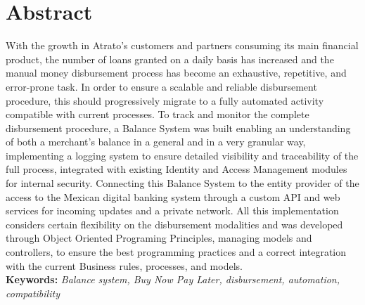 
\chapter*{Abstract}

With the growth in Atrato’s customers and partners consuming its main financial product, the number of loans granted on a daily basis has increased and the manual money disbursement process has become an exhaustive, repetitive, and error-prone task. 
In order to ensure a scalable and reliable disbursement procedure, this should progressively migrate to a fully automated activity compatible with current processes.
To track and monitor the complete disbursement procedure, a Balance System was built enabling an understanding of both a merchant's balance in a general and in a very granular way, implementing a logging system to ensure detailed visibility and traceability of the full process, integrated with existing Identity and Access Management modules for internal security.
 Connecting this Balance System to the entity provider of the access to the Mexican digital banking system through a custom API and web services for incoming updates and a private network. All this implementation considers certain flexibility on the disbursement modalities and was developed through Object Oriented Programing Principles, managing models and controllers, to ensure the best programming practices and a correct integration with the current Business rules, processes, and models.\\

 \textbf{Keywords: }\textit{Balance system, Buy Now Pay Later, disbursement, automation, compatibility}